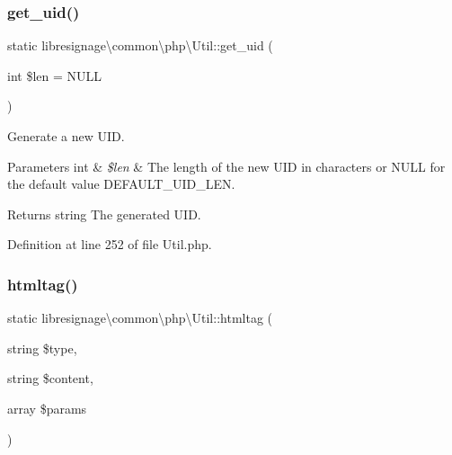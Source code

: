 \mbox{\label{classlibresignage_1_1common_1_1php_1_1Util_a32b77dcda1e1aebea31b66741463e62d}} 
\subsubsection{\texorpdfstring{get\+\_\+uid()}{get\_uid()}}
{\footnotesize\ttfamily static libresignage\textbackslash{}common\textbackslash{}php\textbackslash{}\+Util\+::get\+\_\+uid (\begin{DoxyParamCaption}\item[{int}]{\$len = {\ttfamily NULL} }\end{DoxyParamCaption})\hspace{0.3cm}{\ttfamily [static]}}

Generate a new U\+ID.


\begin{DoxyParams}[1]{Parameters}
int & {\em \$len} & The length of the new U\+ID in characters or N\+U\+LL for the default value {\ttfamily D\+E\+F\+A\+U\+L\+T\+\_\+\+U\+I\+D\+\_\+\+L\+EN}.\\
\hline
\end{DoxyParams}
\begin{DoxyReturn}{Returns}
string The generated U\+ID. 
\end{DoxyReturn}


Definition at line 252 of file Util.\+php.

\mbox{\label{classlibresignage_1_1common_1_1php_1_1Util_a081033d9d7dc771b7d0339d1258a4d2d}} 
\subsubsection{\texorpdfstring{htmltag()}{htmltag()}}
{\footnotesize\ttfamily static libresignage\textbackslash{}common\textbackslash{}php\textbackslash{}\+Util\+::htmltag (\begin{DoxyParamCaption}\item[{string}]{\$type,  }\item[{string}]{\$content,  }\item[{array}]{\$params }\end{DoxyParamCaption})\hspace{0.3cm}{\ttfamily [static]}}


